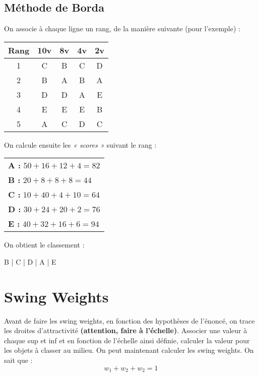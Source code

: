 \documentclass{article}
\begin{document}
\subsection{Méthode de Borda}

On associe à chaque ligne un rang, de la manière suivante (pour l'exemple) : 

\begin{center}
	\begin{tabular}{|*{5}{c|}}
	\hline
	\textbf{Rang} & \textbf{10v }& \textbf{8v} & \textbf{4v} & \textbf{2v} \\
	\hline
	1 & C & B & C & D \\
	2 & B & A & B & A \\
	3 & D & D & A & E \\
	4 & E & E & E & B \\
	5 & A & C & D & C \\
	\hline
	\end{tabular}
\end{center}

On calcule ensuite les \textit{« scores »} suivant le rang : 

\begin{center}
	\begin{tabular}{l}
	\textbf{A : } $50+16+12+4 = \boxed{82}$  \\
	\textbf{B : } $20+8+8+8 = \boxed{44}$ \\
	\textbf{C : } $10+40+4+10 = \boxed{64}$ \\
	\textbf{D : } $30+24+20+2 = \boxed{76}$ \\
	\textbf{E : } $40+32+16+6 = \boxed{94}$
	\end{tabular}
\end{center}

\newpage

On obtient le classement : 

\begin{center}
	\begin{boxedverbatim}
 B
 |
 C
 |
 D
 |
 A
 |
 E
	\end{boxedverbatim}
\end{center}

\section{Swing Weights}

Avant de faire les swing weights, en fonction des hypothèses de l'énoncé, on trace les droites d'attractivité \textbf{(attention, faire à l'échelle)}. Associer une valeur à chaque sup 
et inf et en fonction de l'échelle ainsi définie, calculer la valeur pour les objets à classer au milieu. On peut maintenant calculer les swing weights. On sait que : 
\[ \boxed{w_1 + w_2 + w_2 = 1}\]
\end{document}
